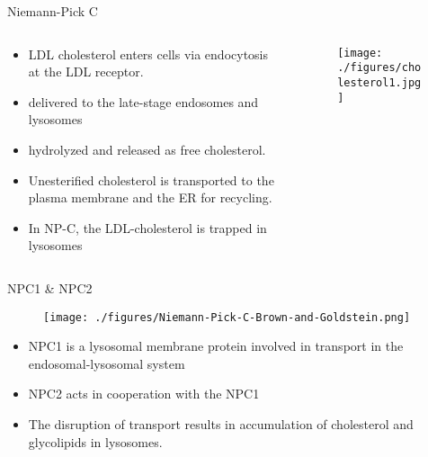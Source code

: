 \documentclass[presentation, smaller]{beamer}
\begin{document}
\begin{frame}[label={sec:orgheadline6}]{Niemann-Pick C}
\begin{columns}
\begin{column}{0.5\columnwidth}
\begin{itemize}
\item LDL cholesterol enters cells via endocytosis at the LDL receptor.
\item delivered to the late-stage endosomes and lysosomes
\item hydrolyzed and released as free cholesterol.
\item Unesterified cholesterol is transported to the plasma membrane and the ER for recycling.

\item In NP-C, the LDL-cholesterol is trapped in lysosomes
\end{itemize}
\end{column}

\begin{column}{0.5\columnwidth}
\begin{figure}[htb]
\centering
\texttt{[image: ./figures/cholesterol1.jpg]}
\label{fig:}
\end{figure}
\end{column}
\end{columns}
\end{frame}


\begin{frame}[label={sec:orgheadline7}]{NPC1 \& NPC2}
\begin{figure}[htb]
\centering
\texttt{[image: ./figures/Niemann-Pick-C-Brown-and-Goldstein.png]}
\label{fig:}
\end{figure}

\footnotesize
\begin{itemize}
\item NPC1 is a lysosomal membrane protein involved in transport in the endosomal-lysosomal system
\item NPC2 acts in cooperation with the NPC1
\item The disruption of transport results in accumulation of cholesterol and glycolipids in lysosomes.
\end{itemize}
\end{frame}
\end{document}
